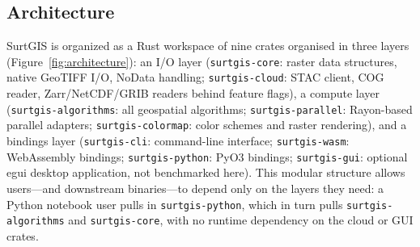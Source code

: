 \documentclass[preprint,review,12pt,authoryear]{elsarticle}
\begin{document}
\subsection{Architecture}
\label{subsec:architecture}

SurtGIS is organized as a Rust workspace of nine crates organised in three layers (Figure~\ref{fig:architecture}): an I/O layer (\texttt{surtgis-core}: raster data structures, native GeoTIFF I/O, NoData handling; \texttt{surtgis-cloud}: STAC client, COG reader, Zarr/NetCDF/GRIB readers behind feature flags), a compute layer (\texttt{surtgis-algorithms}: all geospatial algorithms; \texttt{surtgis-parallel}: Rayon-based parallel adapters; \texttt{surtgis-colormap}: color schemes and raster rendering), and a bindings layer (\texttt{surtgis-cli}: command-line interface; \texttt{surtgis-wasm}: WebAssembly bindings; \texttt{surtgis-python}: PyO3 bindings; \texttt{surtgis-gui}: optional egui desktop application, not benchmarked here). This modular structure allows users---and downstream binaries---to depend only on the layers they need: a Python notebook user pulls in \texttt{surtgis-python}, which in turn pulls \texttt{surtgis-algorithms} and \texttt{surtgis-core}, with no runtime dependency on the cloud or GUI crates.
\end{document}
